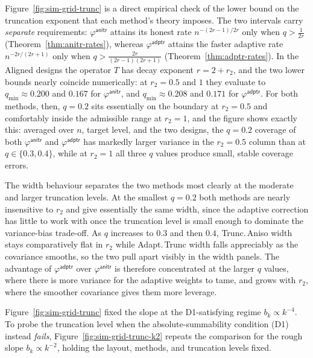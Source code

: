 \documentclass[aos]{imsart}
\newcommand{\anitr}{\mathsf{anitr}}
\newcommand{\adptr}{\mathsf{adptr}}
\theoremstyle{plain}
\theoremstyle{definition}
\theoremstyle{definition}
\begin{document}
Figure~\ref{fig:sim-grid-trunc} is a direct empirical check of the lower bound on the truncation exponent that each method's theory imposes. The two intervals carry \emph{separate} requirements: $\varphi^{\anitr}$ attains its honest rate $n^{-(2r-1)/2r}$ only when $q>\tfrac{1}{2r}$ (Theorem~\ref{thm:anitr-rates}), whereas $\varphi^{\adptr}$ attains the faster adaptive rate $n^{-2r/(2r+1)}$ only when $q>\tfrac{2r}{(2r-1)(2r+1)}$ (Theorem~\ref{thm:adptr-rates}). In the Aligned designs the operator $T$ has decay exponent $r=2+r_2$, and the two lower bounds nearly coincide numerically: at $r_2=0.5$ and $1$ they evaluate to $q_{\min}\approx 0.200$ and $0.167$ for $\varphi^{\anitr}$, and $q_{\min}\approx 0.208$ and $0.171$ for $\varphi^{\adptr}$. For both methods, then, $q=0.2$ sits essentially on the boundary at $r_2=0.5$ and comfortably inside the admissible range at $r_2=1$, and the figure shows exactly this: averaged over $n$, target level, and the two designs, the $q=0.2$ coverage of both $\varphi^{\anitr}$ and $\varphi^{\adptr}$ has markedly larger variance in the $r_2=0.5$ column than at $q\in\{0.3,0.4\}$, while at $r_2=1$ all three $q$ values produce small, stable coverage errors.

The width behaviour separates the two methods most clearly at the moderate and larger truncation levels. At the smallest $q=0.2$ both methods are nearly insensitive to $r_2$ and give essentially the same width, since the adaptive correction has little to work with once the truncation level is small enough to dominate the variance-bias trade-off. As $q$ increases to $0.3$ and then $0.4$, Trunc.\,Aniso width stays comparatively flat in $r_2$ while Adapt.\,Trunc width falls appreciably as the covariance smooths, so the two pull apart visibly in the width panels. The advantage of $\varphi^{\adptr}$ over $\varphi^{\anitr}$ is therefore concentrated at the larger $q$ values, where there is more variance for the adaptive weights to tame, and grows with $r_2$, where the smoother covariance gives them more leverage.

Figure~\ref{fig:sim-grid-trunc} fixed the slope at the D1-satisfying regime $b_k\propto k^{-4}$. To probe the truncation level when the absolute-summability condition (D1) instead \emph{fails}, Figure~\ref{fig:sim-grid-trunc-k2} repeats the comparison for the rough slope $b_k\propto k^{-2}$, holding the layout, methods, and truncation levels fixed.
\end{document}
